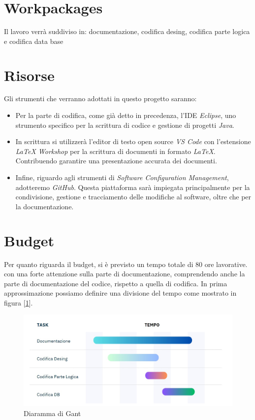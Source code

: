 \documentclass{book}
\begin{document}
\section{Workpackages}

Il lavoro verrà suddiviso in: documentazione, codifica desing, codifica parte logica e codifica data base

\section{Risorse}

Gli strumenti che verranno adottati in questo progetto saranno:
\begin{itemize}
    \item Per la parte di codifica, come già detto in precedenza, l'IDE \textit{Eclipse}, uno strumento specifico per la scrittura di codice e gestione di progetti \textit{Java}.
    \item In scrittura si utilizzerà l'editor di testo open source \textit{VS Code} con l'estensione \textit{LaTeX Workshop} per la scrittura di documenti in formato \textit{LaTeX}. Contribuendo garantire una presentazione accurata dei documenti.
    \item Infine, riguardo agli strumenti di \textit{Software Configuration Management}, adotteremo \textit{GitHub}. Questa piattaforma sarà impiegata principalmente per la condivisione, gestione e tracciamento delle modifiche al software, oltre che per la documentazione. 

\end{itemize}

\section{Budget}

Per quanto riguarda il budget, si è previsto un tempo totale di 80 ore lavorative. con una forte attenzione sulla parte di documentazione, comprendendo anche la parte di documentazione del codice, rispetto a quella di codifica.
In prima approssimazione possiamo definire una divisione del tempo come mostrato in figura [\ref{fig: diagramma_gant}]. 
\begin{figure}[h]
    \centering
    \includegraphics[width = 1\linewidth]{Diagramma_Gant.jpg}
    \caption{Diaramma di Gant}
    \label{fig: diagramma_gant}    
\end{figure}
\end{document}
